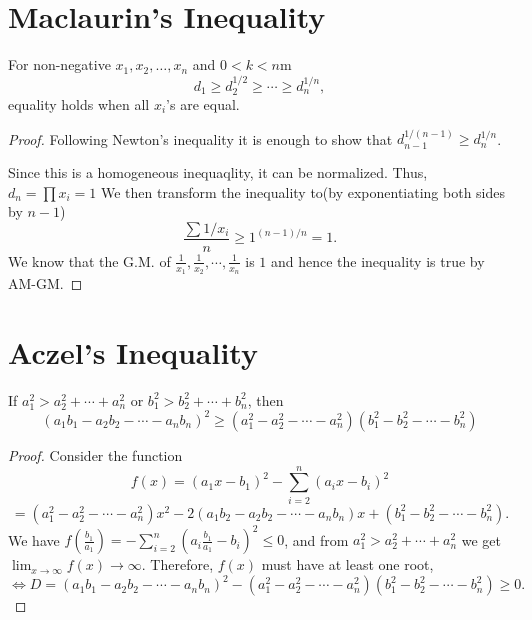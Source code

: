 \section{Maclaurin's Inequality}
\begin{theorem}
  For non-negative $x_1, x_2, \ldots, x_n$ and $0<k< n$m
  \begin{equation}
    d_1\geq d_2^{1/2}\geq\cdots\geq d_n^{1/n},
  \end{equation}
  equality holds when all $x_i$'s are equal.
\end{theorem}

\begin{proof}
  Following Newton's inequality it is enough to show that $d_{n-1}^{1/(n-1)}\geq d_n^{1/n}$.

  Since this is a homogeneous inequaqlity, it can be normalized. Thus, $d_n = \prod x_i = 1$ We then transform the inequality to(by
  exponentiating both sides by $n-1$)
  $$\frac{\sum 1/x_i}{n}\geq 1^{(n-1)/n} = 1.$$ We know that the G.M. of $\frac{1}{x_1}, \frac{1}{x_2}, \cdots,
  \frac{1}{x_n}$ is $1$ and hence the inequality is true by AM-GM.
\end{proof}

\section{Aczel's Inequality}
\begin{theorem}
  If $a_1^2>a_2^2 + \cdots + a_n^2$ or $b_1^2 > b_2^2 + \cdots + b_n^2$, then
  \begin{equation}
    (a_1b_1 - a_2b_2 - \cdots - a_nb_n)^2 \geq (a_1^2 - a_2^2 - \cdots - a_n^2)(b_1^2 - b_2^2 - \cdots - b_n^2)
  \end{equation}
\end{theorem}

\begin{proof}
  Consider the function $$f(x) = (a_1x  - b_1)^2 - \sum_{i=2}^n(a_ix - b_i)^2$$
  $$= (a_1^2 - a_2^2 - \cdots - a_n^2)x^2 - 2(a_1b_2 - a_2b_2 - \cdots - a_nb_n)x + (b_1^2 - b_2^2 - \cdots - b_n^2).$$
  We have $f\left(\frac{b_1}{a_1}\right) = -\sum_{i=2}^n\left(a_i\frac{b_1}{a_1} - b_i\right)^2 \leq 0$, and from $a_1^2>a_2^2 +
  \cdots + a_n^2$ we get $\displaystyle\lim_{x\to\infty}f(x)\rightarrow\infty$. Therefore, $f(x)$ must have at least one root,
  $\Leftrightarrow D = (a_1b_1 - a_2b_2 - \cdots - a_nb_n)^2 - (a_1^2 - a_2^2 - \cdots - a_n^2)(b_1^2 - b_2^2 - \cdots - b_n^2)\geq
  0.$
\end{proof}

